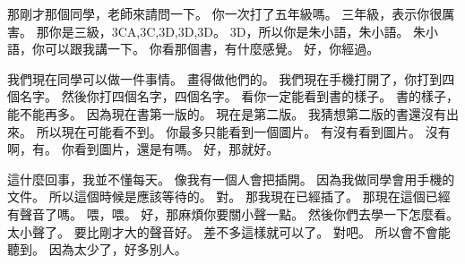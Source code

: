 \hypertarget{c01:cue:39}{}那剛才那個同學，老師來請問一下。
\hypertarget{c01:cue:40}{}你一次打了五年級嗎。
\hypertarget{c01:cue:41}{}三年級，表示你很厲害。
\hypertarget{c01:cue:42}{}那你是三級，3CA,3C,3D,3D,3D。
\hypertarget{c01:cue:43}{}3D，所以你是朱小語，朱小語。
\hypertarget{c01:cue:44}{}朱小語，你可以跟我講一下。
\hypertarget{c01:cue:45}{}你看那個書，有什麼感覺。
\hypertarget{c01:cue:46}{}好，你經過。

\hypertarget{c01:cue:47}{}我們現在同學可以做一件事情。
\hypertarget{c01:cue:48}{}畫得做他們的。
\hypertarget{c01:cue:49}{}我們現在手機打開了，你打到四個名字。
\hypertarget{c01:cue:50}{}然後你打四個名字，四個名字。
\hypertarget{c01:cue:51}{}看你一定能看到書的樣子。
\hypertarget{c01:cue:52}{}書的樣子，能不能再多。
\hypertarget{c01:cue:53}{}因為現在書第一版的。
\hypertarget{c01:cue:54}{}現在是第二版。
\hypertarget{c01:cue:55}{}我猜想第二版的書還沒有出來。
\hypertarget{c01:cue:56}{}所以現在可能看不到。
\hypertarget{c01:cue:57}{}你最多只能看到一個圖片。
\hypertarget{c01:cue:58}{}有沒有看到圖片。
\hypertarget{c01:cue:59}{}沒有啊，有。
\hypertarget{c01:cue:60}{}你看到圖片，還是有嗎。
\hypertarget{c01:cue:61}{}好，那就好。

\hypertarget{c01:cue:62}{}這什麼回事，我並不懂每天。
\hypertarget{c01:cue:63}{}像我有一個人會把插開。
\hypertarget{c01:cue:64}{}因為我做同學會用手機的文件。
\hypertarget{c01:cue:65}{}所以這個時候是應該等待的。
\hypertarget{c01:cue:66}{}對。
\hypertarget{c01:cue:67}{}那我現在已經插了。
\hypertarget{c01:cue:68}{}那現在這個已經有聲音了嗎。
\hypertarget{c01:cue:69}{}喂，喂。
\hypertarget{c01:cue:70}{}好，那麻煩你要關小聲一點。
\hypertarget{c01:cue:71}{}然後你們去學一下怎麼看。
\hypertarget{c01:cue:72}{}太小聲了。
\hypertarget{c01:cue:73}{}要比剛才大的聲音好。
\hypertarget{c01:cue:74}{}差不多這樣就可以了。
\hypertarget{c01:cue:75}{}對吧。
\hypertarget{c01:cue:76}{}所以會不會能聽到。
\hypertarget{c01:cue:77}{}因為太少了，好多別人。

